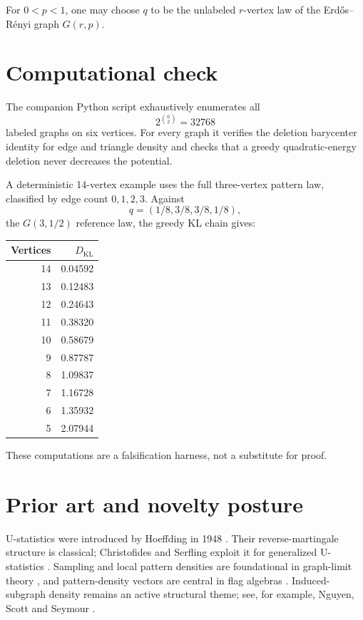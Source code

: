 \documentclass[11pt]{article}
\begin{document}
For $0<p<1$, one may choose $q$ to be the unlabeled $r$-vertex law of the Erd\H{o}s--R\'enyi graph $G(r,p)$.

\section{Computational check}
The companion Python script exhaustively enumerates all
\[
2^{\binom 62}=32768
\]
labeled graphs on six vertices. For every graph it verifies the deletion barycenter identity for edge and triangle density and checks that a greedy quadratic-energy deletion never decreases the potential.

A deterministic 14-vertex example uses the full three-vertex pattern law, classified by edge count $0,1,2,3$. Against
\[
q=(1/8,3/8,3/8,1/8),
\]
the $G(3,1/2)$ reference law, the greedy KL chain gives:

\begin{center}
\begin{tabular}{rr}
\toprule
Vertices & $D_{\mathrm{KL}}$ \\
\midrule
14 & 0.04592\\
13 & 0.12483\\
12 & 0.24643\\
11 & 0.38320\\
10 & 0.58679\\
9  & 0.87787\\
8  & 1.09837\\
7  & 1.16728\\
6  & 1.35932\\
5  & 2.07944\\
\bottomrule
\end{tabular}
\end{center}

These computations are a falsification harness, not a substitute for proof.

\section{Prior art and novelty posture}
U-statistics were introduced by Hoeffding in 1948 \cite{hoeffding1948}. Their reverse-martingale structure is classical; Christofides and Serfling exploit it for generalized U-statistics \cite{christofides1990}. Sampling and local pattern densities are foundational in graph-limit theory \cite{lovasz2012}, and pattern-density vectors are central in flag algebras \cite{razborov2007}. Induced-subgraph density remains an active structural theme; see, for example, Nguyen, Scott and Seymour \cite{nguyen2026}.
\end{document}
